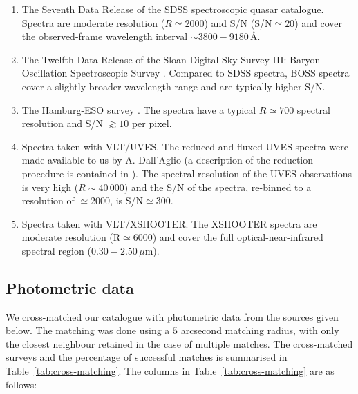\begin{enumerate}

 \item The Seventh Data Release \citep[DR$7$;][]{schneider10} of the SDSS spectroscopic quasar catalogue. Spectra are moderate resolution ($R\simeq2000$) and S/N (S/N$\simeq20$) and cover the observed-frame wavelength interval $\sim3800-9180$\,\AA.   
 
 \item The Twelfth Data Release \citep[DR$12$;][]{paris17} of the Sloan Digital Sky Survey-III: Baryon Oscillation Spectroscopic Survey \citep[SDSS-III/BOSS;][]{dawson13}. Compared to SDSS spectra, BOSS spectra cover a slightly broader wavelength range and are typically higher S/N. 

 \item The Hamburg-ESO survey \citep{wisotzki00}. The spectra have a typical $R\simeq700$ spectral resolution and S/N $\gtrsim10$ per pixel. 

 \item Spectra taken with VLT/UVES. The reduced and fluxed UVES spectra were made available to us by A. Dall'Aglio (a description of the reduction procedure is contained in \citealt{dallaglio08}). The spectral resolution of the UVES observations is very high ($R\sim40\,000$) and the S/N of the spectra, re-binned to a resolution of $\simeq2000$, is S/N$\simeq300$. 

 \item Spectra taken with VLT/XSHOOTER. The XSHOOTER spectra are moderate resolution (R$\simeq6000$) and cover the full optical-near-infrared spectral region ($0.30-2.50$\,$\mu$m). 

\end{enumerate}

\subsection{Photometric data}

We cross-matched our catalogue with photometric data from the sources given below. 
The matching was done using a $5$ arcsecond matching radius, with only the closest neighbour retained in the case of multiple matches. 
The cross-matched surveys and the percentage of successful matches is summarised in Table~\ref{tab:cross-matching}. 
The columns in Table~\ref{tab:cross-matching} are as follows:

